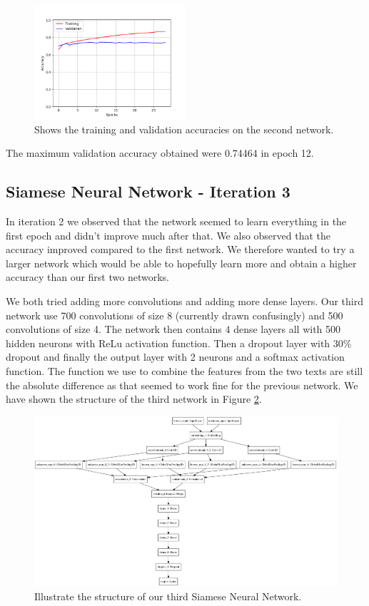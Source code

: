 \begin{figure}
    \centering
    \includegraphics[width=0.5\textwidth]{./pictures/method/network_2_accuracies.png}
    \caption{Shows the training and validation accuracies on the second
        network.}
    \label{fig:network2_accuracies}
\end{figure}

The maximum validation accuracy obtained were 0.74464 in epoch 12.


\subsection{Siamese Neural Network - Iteration 3}

In iteration 2 we observed that the network seemed to learn everything in the
first epoch and didn't improve much after that. We also observed that the
accuracy improved compared to the first network. We therefore wanted to try a
larger network which would be able to hopefully learn more and obtain a higher
accuracy than our first two networks.

We both tried adding more convolutions and adding more dense layers. Our third
network use 700 convolutions of size 8 (currently drawn confusingly) and 500
convolutions of size 4. The network then contains 4 dense layers all with 500
hidden neurons with \gls{ReLu} activation function. Then a dropout layer with
30\% dropout and finally the output layer with 2 neurons and a softmax
activation function. The function we use to combine the features from the two
texts are still the absolute difference as that seemed to work fine for the
previous network. We have shown the structure of the third network in Figure
\ref{fig:network3}.

\begin{figure}
    \centering
    \includegraphics[width=\textwidth]{./pictures/method/network3.png}
    \caption{Illustrate the structure of our third Siamese Neural Network.}
    \label{fig:network3}
\end{figure}


